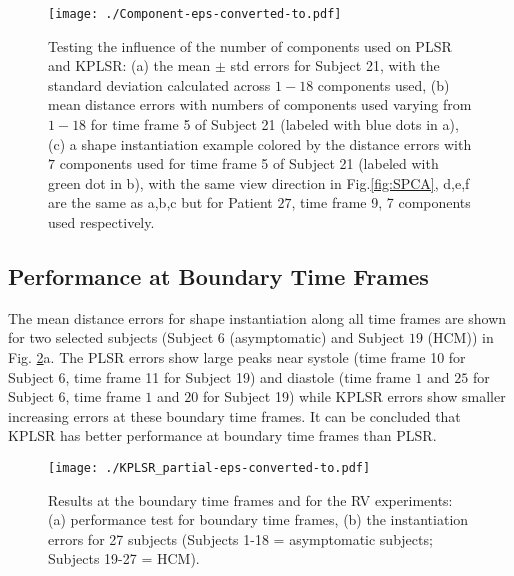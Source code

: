 \documentclass[review]{elsarticle}
\begin{document}
\begin{figure}[thpb]
\centering
\texttt{[image: ./Component-eps-converted-to.pdf]}
\caption{Testing the influence of the number of components used on PLSR and KPLSR: (a) the mean $\pm$ std errors for Subject 21, with the standard deviation calculated across $1-18$ components used, (b) mean distance errors with numbers of components used varying from $1-18$ for time frame 5 of Subject 21 (labeled with blue dots in a), (c) a shape instantiation example colored by the distance errors with $7$ components used for time frame 5 of Subject 21 (labeled with green dot in b), with the same view direction in Fig.\ref{fig:SPCA}, d,e,f are the same as a,b,c but for Patient $27$, time frame 9, 7 components used respectively.}
\label{fig:Com}
\end{figure}

\subsection{Performance at Boundary Time Frames}
\label{sub: Stability to Boundary Conditions}
The mean distance errors for shape instantiation along all time frames are shown for two selected subjects (Subject $6$ (asymptomatic) and Subject $19$ (HCM)) in Fig. \ref{fig:partial}a. The PLSR errors show large peaks near systole (time frame 10 for Subject 6, time frame 11 for Subject 19) and diastole (time frame $1$ and $25$ for Subject 6, time frame $1$ and $20$ for Subject 19) while KPLSR errors show smaller increasing errors at these boundary time frames. It can be concluded that KPLSR has better performance at boundary time frames than PLSR.

\begin{figure}[thpb]
\centering
\texttt{[image: ./KPLSR\_partial-eps-converted-to.pdf]}
\caption{Results at the boundary time frames and for the RV experiments: (a) performance test for boundary time frames, (b) the instantiation errors for 27 subjects (Subjects 1-18 = asymptomatic subjects; Subjects 19-27 = HCM).}
\label{fig:partial}
\end{figure}
\end{document}
